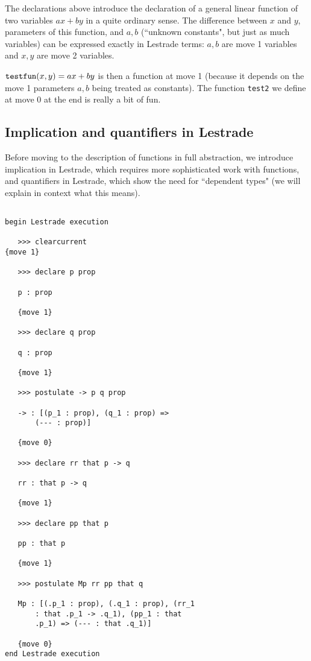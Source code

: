 \documentclass[12pt]{article}
\begin{document}
The declarations above introduce the declaration of a general linear function of two variables $ax+by$ in a quite ordinary sense.  The difference between $x$ and $y$, parameters of this function, and $a,b$ (``unknown constants", but just as much variables) can be expressed exactly in Lestrade terms:  $a,b$ are move 1 variables and $x,y$ are move 2 variables.

${\tt testfun}(x,y) = ax+by$ is then a function at move 1 (because it depends on the move 1 parameters $a,b$ being treated as constants).  The function {\tt test2} we define at move 0 at the end is really a bit of fun.

\newpage

\subsection{Implication and quantifiers in Lestrade}

Before moving to the description of functions in full abstraction, we introduce implication in Lestrade, which requires
more sophisticated work with functions, and quantifiers in Lestrade, which show the need for ``dependent types" (we will explain in context what this means).

\begin{verbatim}

begin Lestrade execution

   >>> clearcurrent
{move 1}

   >>> declare p prop

   p : prop

   {move 1}

   >>> declare q prop

   q : prop

   {move 1}

   >>> postulate -> p q prop

   -> : [(p_1 : prop), (q_1 : prop) => 
       (--- : prop)]

   {move 0}

   >>> declare rr that p -> q

   rr : that p -> q

   {move 1}

   >>> declare pp that p

   pp : that p

   {move 1}

   >>> postulate Mp rr pp that q

   Mp : [(.p_1 : prop), (.q_1 : prop), (rr_1 
       : that .p_1 -> .q_1), (pp_1 : that 
       .p_1) => (--- : that .q_1)]

   {move 0}
end Lestrade execution

\end{verbatim}
\end{document}
